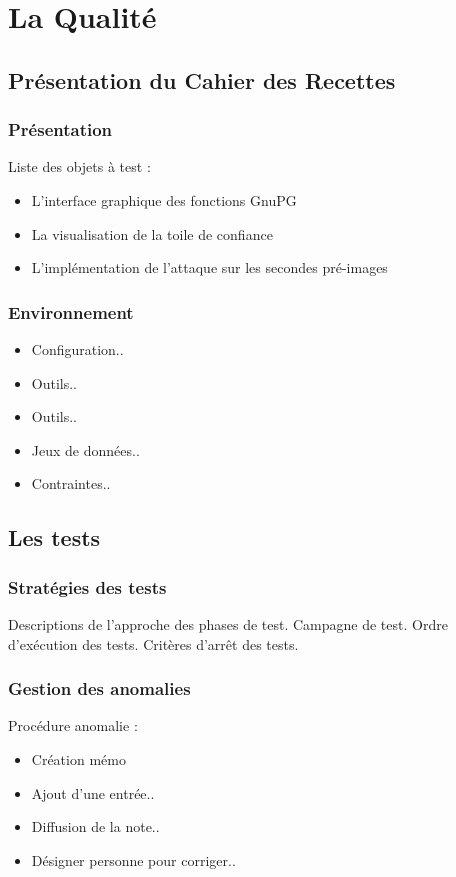 \section{La Qualité}


\subsection{Présentation du Cahier des Recettes}

\begin{frame}
  \frametitle{\color{white} Présentation}
  Liste des objets à test :
  \begin{itemize}
  \item L'interface graphique des fonctions GnuPG
  \item La visualisation de la toile de confiance
  \item L'implémentation de l'attaque sur les secondes pré-images
  \end{itemize}
\end{frame}

\begin{frame}
  \frametitle{\color{white} Environnement}
  \begin{itemize}
  \item Configuration..
  \item Outils..
  \item Outils..
  \item Jeux de données..
  \item Contraintes..
  \end{itemize}
  
\end{frame}



\subsection{Les tests}
\begin{frame}
  \frametitle{\color{white} Stratégies des tests}
  Descriptions de l'approche des phases de test.
  Campagne de test.
  Ordre d'exécution des tests.
  Critères d'arrêt des tests.
\end{frame}

\begin{frame}
  \frametitle{\color{white} Gestion des anomalies}
  Procédure anomalie :
  \begin{itemize}
  \item Création mémo
  \item Ajout d'une entrée..
  \item Diffusion de la note..
  \item Désigner personne pour corriger..
  \end{itemize}
\end{frame}



